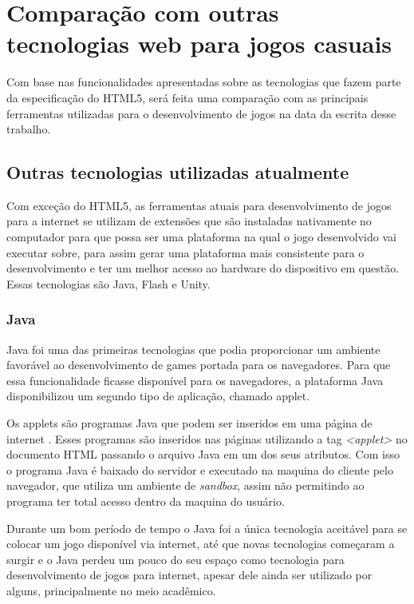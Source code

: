 \section{Comparação com outras tecnologias web para jogos casuais}

Com base nas funcionalidades apresentadas sobre as tecnologias que
fazem parte da especificação do HTML5, será feita uma comparação com
as principais ferramentas utilizadas para o desenvolvimento de jogos
na data da escrita desse trabalho.

\subsection{Outras tecnologias utilizadas atualmente}

Com exceção do HTML5, as ferramentas atuais para desenvolvimento de jogos para a internet se
utilizam de extensões que são instaladas nativamente no computador
para que possa ser uma plataforma na qual o jogo desenvolvido vai
executar sobre, para assim gerar uma plataforma mais consistente para
o desenvolvimento e ter um melhor acesso ao hardware do dispositivo em
questão. Essas tecnologias são Java, Flash e Unity.

\subsubsection{Java}

Java foi uma das primeiras tecnologias que podia proporcionar um
ambiente favorável ao desenvolvimento de games portada para os
navegadores. Para que essa funcionalidade ficasse disponível para os
navegadores, a plataforma Java disponibilizou um segundo tipo de aplicação,
chamado applet.

Os applets são programas Java que podem ser inseridos em uma página de
internet \cite{boese2009introduction}. Esses programas são inseridos nas
páginas utilizando a tag \textit{<applet>} no documento HTML passando
o arquivo Java em um dos seus atributos. Com isso o programa Java é
baixado do servidor e executado na maquina do cliente pelo navegador,
que utiliza um ambiente de \textit{sandbox}, assim não permitindo
ao programa ter total acesso dentro da maquina do usuário.

Durante um bom período de tempo o Java foi a única tecnologia
aceitável para se colocar um jogo disponível via internet, até que
novas tecnologias começaram a surgir e o Java perdeu um pouco do seu
espaço como tecnologia para desenvolvimento de jogos para internet,
apesar dele ainda ser utilizado por alguns, principalmente no meio
acadêmico.

